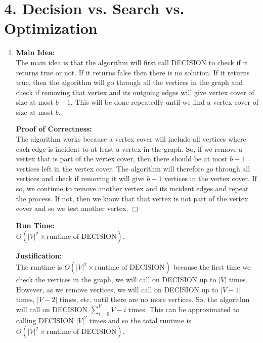 \documentclass[11pt]{article}
\def\endproofmark{$\Box$}
\newenvironment{mainIdea}{\par{\bf Main Idea:}}{\smallskip}
\newenvironment{proofOfCorrectness}{\par{\bf Proof of Correctness:}}{\endproofmark\smallskip}
\newenvironment{runTime}{\par{\bf Run Time:}}{\smallskip}
\newenvironment{justification}{\par{\bf Justification:}}{\smallskip}
\begin{document}
\section*{4. Decision vs. Search vs. Optimization}
\begin{enumerate}[label=(\alph*)]
\item
\begin{mainIdea}
\\
The main idea is that the algorithm will first call DECISION to check if it returns true or not. If it returns false then there is no solution. If it returns true, then the algorithm will go through all the vertices in the graph and check if removing that vertex and its outgoing edges will give vertex cover of size at most $b - 1$. This will be done repeatedly until we find a vertex cover of size at most $b$.
\end{mainIdea}
\\
\begin{proofOfCorrectness}
\\
The algorithm works because a vertex cover will include all vertices where each edge is incident to at least a vertex in the graph. So, if we remove a vertex that is part of the vertex cover, then there should be at most $b - 1$ vertices left in the vertex cover. The algorithm will therefore go through all vertices and check if removing it will give $b - 1$ vertices in the vertex cover. If so, we continue to remove another vertex and its incident edges and repeat the process. If not, then we know that that vertex is not part of the vertex cover and so we test another vertex.
\end{proofOfCorrectness}
\\
\begin{runTime}
\\
$O(|V|^2 \times \text{runtime of DECISION})$.
\end{runTime}
\\
\begin{justification}
\\
The runtime is $O(|V|^2 \times \text{runtime of DECISION})$ because the first time we check the vertices in the graph, we will call on DECISION up to $|V|$ times. However, as we remove vertices, we will call on DECISION up to $|V - 1|$ times, $|V - 2|$ times, etc. until there are no more vertices. So, the algorithm will call on DECISION $\sum_{i = 0}^{V} {V - i}$ times. This can be approximated to calling DECISION $|V|^2$ times and so the total runtime is $O(|V|^2 \times \text{runtime of DECISION})$.
\end{justification}




\end{enumerate}
\end{document}
